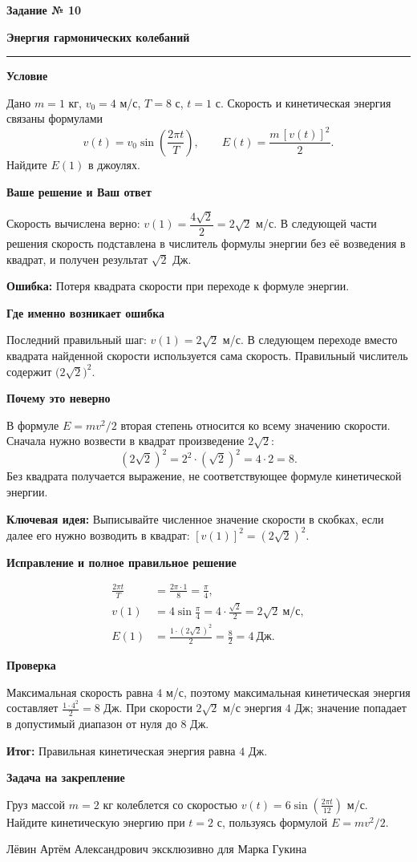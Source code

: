 \documentclass[a4paper,11pt]{article}
\newcommand{\taskheading}[2]{%
  \phantomsection\label{task:#1}%
  {\color{accent}\large\bfseries Задание № #1}\par\vspace{2mm}%
  {\LARGE\bfseries\color{ink}#2}\par\vspace{3mm}\noindent\color{accent}\rule{\linewidth}{0.5pt}\color{black}\par}
\newcommand{\field}[1]{\par\textbf{#1}\par\nobreak}
\newcommand{\idea}{\textcolor{blue!60!black}{\textbf{Ключевая идея:}}}
\newcommand{\mistake}{\textcolor{red!75!black}{\textbf{Ошибка:}}}
\newcommand{\outcome}{\textcolor{teal!60!black}{\textbf{Итог:}}}
\begin{document}
\taskheading{10}{Энергия гармонических колебаний}
\field{Условие}
Дано $m=1$ кг, $v_0=4$ м/с, $T=8$ с, $t=1$ с. Скорость и кинетическая энергия связаны формулами
\[
v(t)=v_0\sin\!\left(\frac{2\pi t}{T}\right),\qquad
E(t)=\frac{m\,[v(t)]^2}{2}.
\]
Найдите $E(1)$ в джоулях.

\field{Ваше решение и Ваш ответ}
Скорость вычислена верно: $v(1)=\dfrac{4\sqrt2}{2}=2\sqrt2$ м/с. В следующей части решения скорость подставлена в числитель формулы энергии без её возведения в квадрат, и получен результат $\sqrt2$ Дж.

\mistake\; Потеря квадрата скорости при переходе к формуле энергии.

\field{Где именно возникает ошибка}
Последний правильный шаг: $v(1)=2\sqrt2$ м/с. В следующем переходе вместо квадрата найденной скорости используется сама скорость. Правильный числитель содержит $\bigl(2\sqrt2\bigr)^2$.

\field{Почему это неверно}
В формуле $E=mv^2/2$ вторая степень относится ко всему значению скорости. Сначала нужно возвести в квадрат произведение $2\sqrt2$:
\[
(2\sqrt2)^2=2^2\cdot(\sqrt2)^2=4\cdot2=8.
\]
Без квадрата получается выражение, не соответствующее формуле кинетической энергии.

\idea\; Выписывайте численное значение скорости в скобках, если далее его нужно возводить в квадрат: $[v(1)]^2=(2\sqrt2)^2$.

\field{Исправление и полное правильное решение}
\[
\begin{aligned}
\frac{2\pi t}{T}&=\frac{2\pi\cdot1}{8}=\frac\pi4,\\
v(1)&=4\sin\frac\pi4=4\cdot\frac{\sqrt2}{2}=2\sqrt2\ \text{м/с},\\
E(1)&=\frac{1\cdot(2\sqrt2)^2}{2}=\frac{8}{2}=4\ \text{Дж}.
\end{aligned}
\]

\field{Проверка}
Максимальная скорость равна $4$ м/с, поэтому максимальная кинетическая энергия составляет $\frac{1\cdot4^2}{2}=8$ Дж. При скорости $2\sqrt2$ м/с энергия $4$ Дж; значение попадает в допустимый диапазон от нуля до $8$ Дж.

\outcome\; Правильная кинетическая энергия равна $4$ Дж.

\field{Задача на закрепление}
Груз массой $m=2$ кг колеблется со скоростью $v(t)=6\sin\!\left(\frac{2\pi t}{12}\right)$ м/с. Найдите кинетическую энергию при $t=2$ с, пользуясь формулой $E=mv^2/2$.
\vfill
\begin{center}
{\color{muted}\small Лёвин Артём Александрович эксклюзивно для Марка Гукина}
\end{center}
\end{document}
